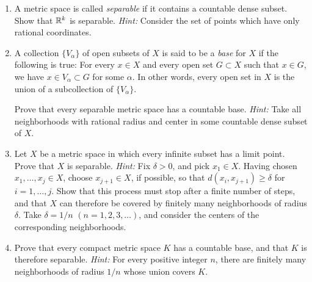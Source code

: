 \begin{enumerate}[label=\textbf{2.\arabic*.}, leftmargin=3.0em, itemsep=9pt,
                  topsep=8pt, labelsep=0.5em]
\item A metric space is called \emph{separable} if it contains a countable
dense subset. Show that $\mathbb{R}^k$ is separable. \emph{Hint:} Consider the set of
points which have only rational coordinates.

\item A collection $\{V_\alpha\}$ of open subsets of $X$ is said to be a
\emph{base} for $X$ if the following is true: For every $x \in X$ and every
open set $G \subset X$ such that $x \in G$, we have
$x \in V_\alpha \subset G$ for some $\alpha$. In other words, every open set in
$X$ is the union of a subcollection of $\{V_\alpha\}$.

Prove that every separable metric space has a countable base. \emph{Hint:} Take
all neighborhoods with rational radius and center in some countable dense
subset of $X$.

\item Let $X$ be a metric space in which every infinite subset has a limit
point. Prove that $X$ is separable. \emph{Hint:} Fix $\delta > 0$, and pick
$x_1 \in X$. Having chosen $x_1,\dots,x_j \in X$, choose $x_{j+1} \in X$, if
possible, so that $d(x_i,x_{j+1}) \ge \delta$ for $i = 1,\dots,j$. Show that
this process must stop after a finite number of steps, and that $X$ can
therefore be covered by finitely many neighborhoods of radius $\delta$. Take
$\delta = 1/n$ $(n = 1,2,3,\dots)$, and consider the centers of the
corresponding neighborhoods.

\item Prove that every compact metric space $K$ has a countable base, and that
$K$ is therefore separable. \emph{Hint:} For every positive integer $n$, there
are finitely many neighborhoods of radius $1/n$ whose union covers
$K$.


\end{enumerate}
